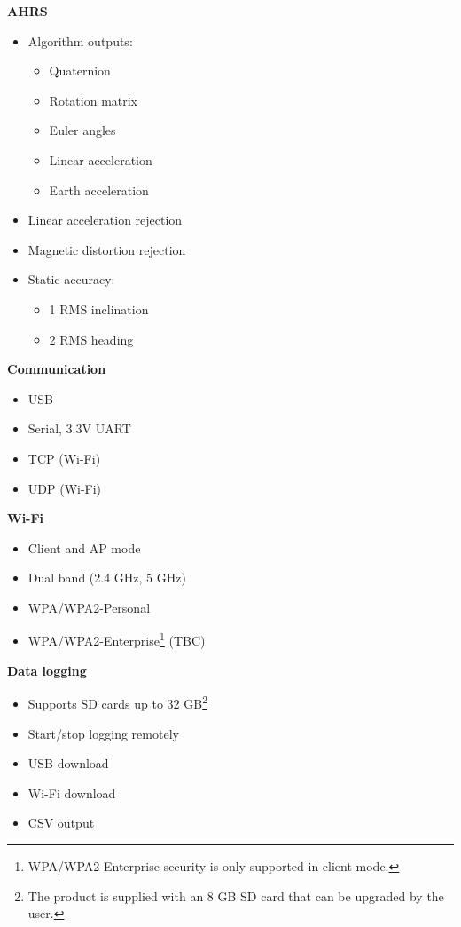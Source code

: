 \begin{multicols}{2}
\textbf{\acs{AHRS}}
\begin{itemize}[nolistsep]
    \item Algorithm outputs:
    \begin{itemize}
        \item Quaternion
        \item Rotation matrix
        \item Euler angles
        \item Linear acceleration
        \item Earth acceleration
    \end{itemize}
    \item Linear acceleration rejection
    \item Magnetic distortion rejection
    \item Static accuracy:
        \begin{itemize}
            \item 1\textdegree{} \acs{RMS} inclination
            \item 2\textdegree{} \acs{RMS} heading
        \end{itemize}
\end{itemize}

\textbf{Communication}
\begin{itemize}[nolistsep]
    \item \acs{USB}
    \item Serial, 3.3V \acs{UART}
    \item \acs{TCP} (Wi-Fi)
    \item \acs{UDP} (Wi-Fi)
\end{itemize}

\textbf{Wi-Fi}
\begin{itemize}[nolistsep]
    \item Client and \acs{AP} mode
    \item Dual band (2.4 GHz, 5 GHz)
    \item WPA/WPA2-Personal
    \item WPA/WPA2-Enterprise\footnote{WPA/WPA2-Enterprise security is only supported in client mode.} (TBC)
\end{itemize}

\textbf{Data logging}
\begin{itemize}[nolistsep]
    \item Supports \acs{SD} cards up to 32 GB\footnote{The product is supplied with an 8 GB \acs{SD} card that can be upgraded by the user.}
    \item Start/stop logging remotely
    \item USB download
    \item Wi-Fi download
    \item \acs{CSV} output
\end{itemize}


\end{multicols}
